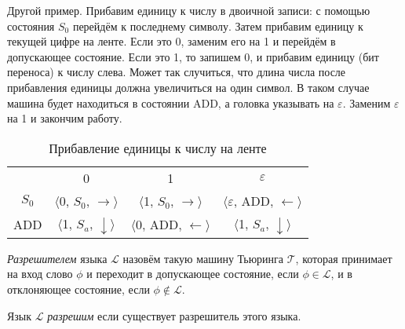 Другой пример. Прибавим единицу к числу в двоичной записи: с помощью состояния $S_0$ перейдём к последнему
символу. Затем прибавим единицу к текущей цифре на ленте. Если это 0, заменим его на 1 и перейдём в
допускающее состояние. Если это 1, то запишем 0, и прибавим единицу (бит переноса) к числу слева. Может
так случиться, что длина числа после прибавления единицы должна увеличиться на один символ. В таком
случае машина будет находиться в состоянии ADD, а головка указывать на $\varepsilon$. Заменим
$\varepsilon$ на 1 и закончим работу.

\begin{table}[h]
    \centering
    \begin{tabular}{c c c c}
        & 0 & 1 & $\varepsilon$ \\
        
        $S_0$ &
        $\langle$0, $S_0$, $\rightarrow\rangle$ & 
        $\langle$1, $S_0$, $\rightarrow\rangle$ & 
        $\langle\varepsilon$, ADD, $\leftarrow\rangle$ \\
        
        ADD &
        $\langle$1, $S_a$, $\downarrow\rangle$ &
        $\langle$0, ADD, $\leftarrow\rangle$ &
        $\langle$1, $S_a$, $\downarrow\rangle$ \\
        
    \end{tabular}
    \caption{Прибавление единицы к числу на ленте}
\end{table}

\begin{definition} \textit{Разрешителем} языка $\mathcal{L}$ назовём такую машину Тьюринга $\mathcal{T}$,
которая принимает на вход слово $\phi$ и переходит в допускающее состояние, если $\phi \in \mathcal{L}$,
и в отклоняющее состояние, если $\phi \notin \mathcal{L}$.
\end{definition} 

\begin{definition} Язык $\mathcal{L}$ \textit{разрешим} если существует разрешитель этого языка.
\end{definition} 

